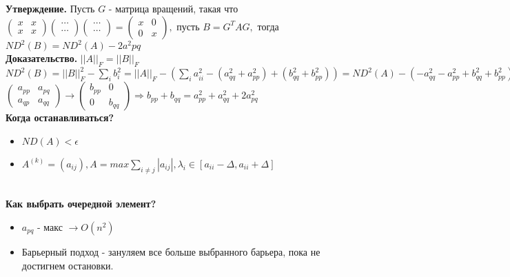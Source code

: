     \textbf{Утверждение.} Пусть \(G\) - матрица вращений, такая что \(
    \begin{pmatrix}
      x & x \\ x & x   
    \end{pmatrix} 
    \begin{pmatrix}
        \cdots \\ \cdots
    \end{pmatrix}
    \begin{pmatrix}
        \cdots \\ \cdots
    \end{pmatrix} = 
    \begin{pmatrix}
      x & 0 \\ 0 & x   
    \end{pmatrix}, 
    \) пусть \(B = G^TAG,\) тогда \(ND^2(B) = ND^2(A) - 2a^2pq\) \\

    \textbf{Доказательство.} \(||A||_F = ||B||_F\)\\
    \(ND^2(B)=||B||_F^2-\sum_ib_i^2=||A||_F-(\sum_ia_{ii}^2 - (a_{qq}^2 + a_{pp}^2) + (b_{qq}^2 + b_{pp}^2)) = ND^2(A) - (-a_{qq}^2 - a_{pp}^2 + b_{qq}^2 + b_{pp}^2)\) \\
    \(\begin{pmatrix}
        a_{pp} & a_{pq} \\
        a_{qp} & a_{qq}
    \end{pmatrix} \rightarrow \begin{pmatrix}
        b_{pp} & 0 \\
        0 & b_{qq}
    \end{pmatrix}  \Rightarrow b_{pp} + b_{qq}=a^2_{pp} + a^2_{qq} + 2a_{pq}^2\) \\

    \textbf{Когда останавливаться?}
    \begin{itemize}
        \item \(ND(A) < \epsilon \)
        \item \(A^{(k)}=(a_{ij}), A = max \sum_{i\neq j}|a_{ij}|, \lambda_i \in [a_{ii}-\Delta, a_{ii} + \Delta]\)
    \end{itemize} \\

    \textbf{Как выбрать очередной элемент?}
    \begin{itemize}
        \item \(a_{pq}\) - макс \(\rightarrow O(n^2)\)
        \item Барьерный подход - зануляем все больше выбранного барьера, пока не достигнем остановки.
    \end{itemize}
